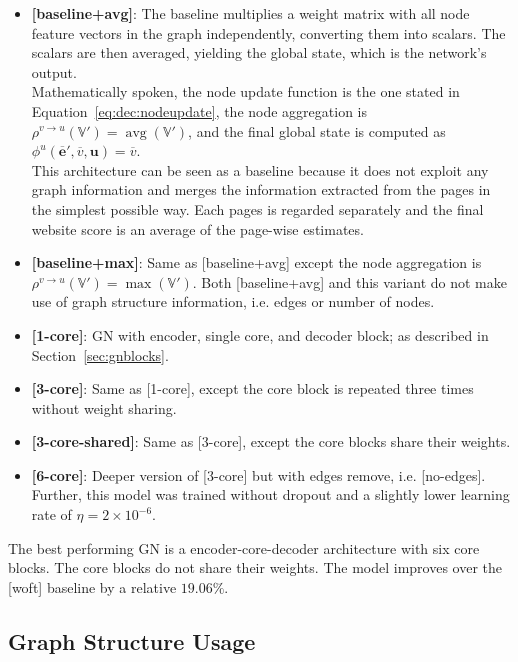 \begin{itemize}
    \item \textbf{[baseline+avg]}: The baseline multiplies a weight matrix with all node feature vectors in the graph independently, converting them into scalars. The scalars are then averaged, yielding the global state, which is the network's output.\\
    Mathematically spoken, the node update function is the one stated in Equation~\ref{eq:dec:nodeupdate}, the node aggregation is $\rho^{v\rightarrow u}\left(\mathbb{V}'\right)=\operatorname{avg}\left(\mathbb{V}'\right)$, and the final global state is computed as $\phi^u\left(\bm{\overline{e}}',\overline{v},\bm{u}\right)=\overline{v}$.\\
    This architecture can be seen as a baseline because it does not exploit any graph information and merges the information extracted from the pages in the simplest possible way. Each pages is regarded separately and the final website score is an average of the page-wise estimates.
    \item \textbf{[baseline+max]}: Same as [baseline+avg] except the node aggregation is $\rho^{v\rightarrow u}\left(\mathbb{V}'\right)=\operatorname{max}\left(\mathbb{V}'\right)$. Both [baseline+avg] and this variant do not make use of graph structure information, i.e. edges or number of nodes.
    \item \textbf{[1-core]}: GN with encoder, single core, and decoder block; as described in Section~\ref{sec:gnblocks}.
    \item \textbf{[3-core]}: Same as [1-core], except the core block is repeated three times without weight sharing.
    \item \textbf{[3-core-shared]}: Same as [3-core], except the core blocks share their weights.
    \item \textbf{[6-core]}: Deeper version of [3-core] but with edges remove, i.e. [no-edges]. Further, this model was trained without dropout and a slightly lower learning rate of $\eta=2\times10^{-6}$.
\end{itemize}

The best performing GN is a encoder-core-decoder architecture with six core blocks. The core blocks do not share their weights. The model improves over the [woft] baseline by a relative $19.06\%$.

\subsection{Graph Structure Usage}
\label{sec:graphstructureusage}

